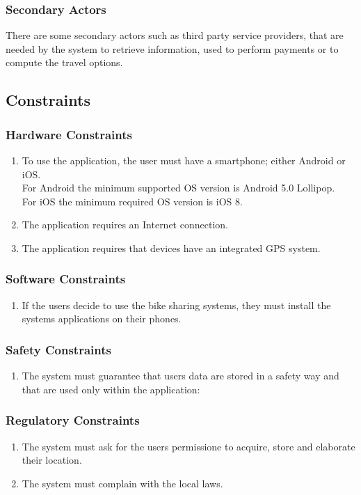 \subsubsection{Secondary Actors}
There are some secondary actors such as third party service providers, that are needed by the system to retrieve information, used to perform payments or to compute the travel options. 


\subsection{Constraints}
\subsubsection{Hardware Constraints}
\begin{enumerate}
\item
To use the application, the user must have a smartphone; either Android or iOS.\\
For Android the minimum supported OS version is Android 5.0 Lollipop.\\
For iOS the minimum required OS version is iOS 8.
\item
The application requires an Internet connection.
\item
The application requires that devices have an integrated GPS system.
\end{enumerate}

\subsubsection{Software Constraints}
\begin{enumerate}
\item
If the users decide to use the bike sharing systems, they must install the systems applications on their phones.
\end{enumerate}

\subsubsection{Safety Constraints}
\begin{enumerate}
\item
The system must guarantee that users data are stored in a safety way and that are used only within the application:
\end{enumerate}

\subsubsection{Regulatory Constraints}
\begin{enumerate}
\item
The system must ask for the users permissione to acquire, store and elaborate their location.
\item
The system must complain with the local laws.
\end{enumerate}


